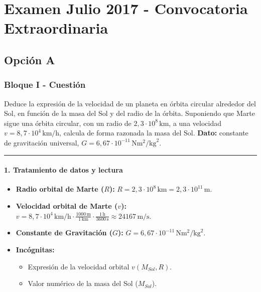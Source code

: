 \chapter{Examen Julio 2017 - Convocatoria Extraordinaria}
\label{chap:2017_jul_ext}

\section{Opción A}
\label{sec:A_2017_jul_ext}

\subsection{Bloque I - Cuestión}
\label{subsec:A1_2017_jul_ext}

\begin{cajaenunciado}
Deduce la expresión de la velocidad de un planeta en órbita circular alrededor del Sol, en función de la masa del Sol y del radio de la órbita. Suponiendo que Marte sigue una órbita circular, con un radio de $2,3\cdot10^{8}\,\text{km}$, a una velocidad $v=8,7\cdot10^{4}\,\text{km/h}$, calcula de forma razonada la masa del Sol.
\textbf{Dato:} constante de gravitación universal, $G=6,67\cdot10^{-11}\,\text{N}\text{m}^2/\text{kg}^2$.
\end{cajaenunciado}
\hrule

\subsubsection*{1. Tratamiento de datos y lectura}
\begin{itemize}
    \item \textbf{Radio orbital de Marte ($R$):} $R = 2,3\cdot10^{8}\,\text{km} = 2,3\cdot10^{11}\,\text{m}$.
    \item \textbf{Velocidad orbital de Marte ($v$):} $v = 8,7\cdot10^{4}\,\text{km/h} \cdot \frac{1000\,\text{m}}{1\,\text{km}} \cdot \frac{1\,\text{h}}{3600\,\text{s}} \approx 24167\,\text{m/s}$.
    \item \textbf{Constante de Gravitación ($G$):} $G=6,67\cdot10^{-11}\,\text{N}\text{m}^2/\text{kg}^2$.
    \item \textbf{Incógnitas:}
    \begin{itemize}
        \item Expresión de la velocidad orbital $v(M_{Sol}, R)$.
        \item Valor numérico de la masa del Sol ($M_{Sol}$).
    \end{itemize}
\end{itemize}

